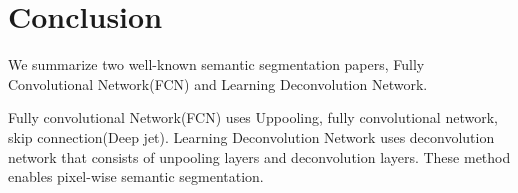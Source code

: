 \documentclass[extendedabs]{bmvc2k}
\begin{document}
\section{Conclusion}
We summarize two well-known semantic segmentation papers, Fully Convolutional Network(FCN)\cite{fullyconvnet} and Learning Deconvolution Network\cite{learndeconv}.

Fully convolutional Network(FCN)\cite{fullyconvnet} uses Uppooling, fully convolutional network, skip connection(Deep jet). Learning Deconvolution Network uses deconvolution network that consists of unpooling layers and deconvolution layers. These method enables pixel-wise semantic segmentation.
\newpage

\end{document}
